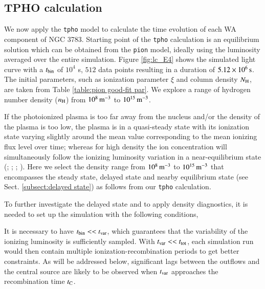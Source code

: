 \documentclass{aa}
\begin{document}
\subsection{TPHO calculation}\label{subsect:tpho calc.}
We now apply the \texttt{tpho} model to calculate the time evolution of each WA component of NGC 3783.
Starting point of the \texttt{tpho} calculation is an equilibrium solution which can be obtained from the \texttt{pion} model, ideally using the luminosity averaged over the entire simulation.
Figure \ref{fig:lc_E4} shows the simulated light curve with a $t_{\rm bin}$ of $10^{4}$ s, $512$ data points resulting in a duration of $5.12 \times 10^{6} \rm \, s$.
%
The initial parameters, such as ionization parameter $\xi$ and column density $ N_{\rm H}$, are taken from Table \ref{table:pion good-fit par}. 
We explore a range of hydrogen number density ($ n_{\rm H}$) from $10^8 \, \rm m^{-3}$ to $10^{15} \, \rm m^{-3}$.


%



If the photoionized plasma is too far away from the nucleus and/or the density of the plasma is too low, the plasma is in a quasi-steady state with its ionization state varying slightly around the mean value corresponding to the mean ionizing flux level over time; whereas for high density the ion concentration will simultaneously follow the ionizing luminosity variation in a near-equilibrium state (\citealp{Krolik&Kriss1995ApJ}; \citealp{Nicastro1999ApJ}; \citealp{Kaastra2012A&A}; \citealp{Silva2016A&A}).
Here we select the density range from $10{^8} \, \rm m^{-3}$ to $10^{15} \, \rm  m^{-3}$ that encompasses the steady state, delayed state and nearby equilibrium state (see Sect. \ref{subsect:delayed state}) as follows from our \texttt{tpho} calculation.


To further investigate the delayed state and to apply density diagnostics, it is needed to set up the simulation with the following conditions,

It is necessary to have $t_{\rm bin} << t_{\rm var}$, which guarantees that the variability of the ionizing luminosity is sufficiently sampled.
With $t_{\rm var} << t_{\rm tot}$, each simulation run would then contain multiple ionization-recombination periods to get better constraints.
As will be addressed below, significant lags between the outflows and the central source are likely to be observed when $t_{\rm var}$ approaches the recombination time $t_{\rm C}$.
\end{document}
